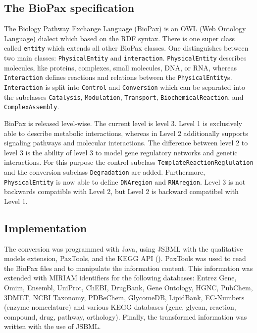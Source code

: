 \documentclass{bioinfo}
\begin{document}
\begin{methods}
\subsection{The BioPax specification}
The Biology Pathway Exchange Language (BioPax) is an OWL (Web Ontology Language) dialect which based on the RDF syntax.
There is one super class called \texttt{entity} which extends all other BioPax classes.
One distinguishes between two main classes: \texttt{PhysicalEntity} and \texttt{interaction}.
\texttt{PhysicalEntity} describes molecules, like proteins, complexes, small molecules, DNA, or RNA, whereas \texttt{Interaction} defines reactions and relations between the \texttt{PhysicalEntity}s.
\texttt{Interaction} is split into \texttt{Control} and \texttt{Conversion}
which can be separated into the subclasses \texttt{Catalysis}, \texttt{Modulation}, \texttt{Transport}, \texttt{BiochemicalReaction}, and \texttt{Complex\-Assembly}.

BioPax is released level-wise.
The current level is level 3.
Level 1 is exclusively able to describe metabolic interactions, whereas in Level 2 additionally supports signaling pathways and molecular interactions.
The difference between level 2 to level 3 is the ability of level 3 to model gene regulatory networks and genetic interactions.
For this purpose the control subclass \texttt{TemplateReactionReglulation} and the conversion subclass \texttt{Degradation} are added.
Furthermore, \texttt{PhysicalEntity} is now able to define \texttt{DNAregion} and \texttt{RNAregion}.
Level 3 is not backwards compatible with Level 2, but Level 2 is backward compatibel with Level 1. \citep{Demir2010}
\subsection{Implementation}
The conversion was programmed with Java, using JSBML \citep{Draeger2011} with the qualitative models extension, PaxTools, and the KEGG API (\citep{Kanehisa2006}).
PaxTools was used to read the BioPax files and to manipulate the information content.
This information was extended with MIRIAM identifiers for the following databases: Entrez Gene, Omim, Ensembl, UniProt, ChEBI, DrugBank, Gene Ontology, HGNC, PubChem, 3DMET, NCBI Taxonomy, PDBeChem, GlycomeDB, LipidBank, EC-Numbers (enzyme nomeclature) and various KEGG databases (gene, glycan, reaction, compound, drug, pathway, orthology).
Finally, the transformed information was written with the use of JSBML.


\end{methods}
\end{document}
